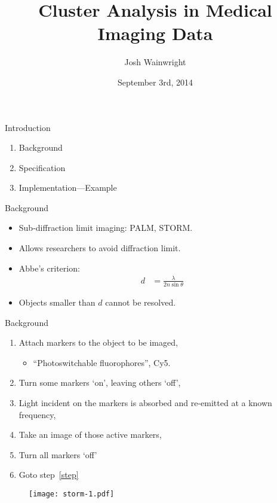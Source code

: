 \documentclass{beamer}
\title{Cluster Analysis in Medical Imaging Data}
\author{Josh Wainwright}
\institute{Supervisor: Iain Styles}
\date{September 3rd, 2014}
\begin{document}
\graphicspath{ {images/} }

\begin{frame}
\titlepage%
\end{frame}

\begin{frame}{Introduction}
	\begin{enumerate}
		\item Background
		\item Specification
		\item Implementation---Example
	\end{enumerate}
\end{frame}

\begin{frame}{Background}
	\begin{itemize}
		\item Sub-diffraction limit imaging: PALM, STORM\@.
		\item Allows researchers to avoid diffraction limit.
		\item Abbe's criterion:
			\begin{align}
				d &= \frac{\lambda}{2n\sin\theta}
			\end{align}
		\item Objects smaller than $d$ cannot be resolved.
	\end{itemize}
\end{frame}

\begin{frame}{Background}
	\begin{enumerate}
		\item Attach markers to the object to be imaged,
			\begin{itemize}
				\item ``Photoswitchable fluorophores'', Cy5.
			\end{itemize}
		\item\label{step} Turn some markers `on', leaving others `off',
		\item Light incident on the markers is absorbed and re-emitted at a
			known frequency,
		\item Take an image of those active markers,
		\item Turn all markers `off'
		\item Goto step~\ref{step}
	\end{enumerate}
\end{frame}

\begin{frame}
	\begin{figure}
		\texttt{[image: storm-1.pdf]}
	\end{figure}
\end{frame}
\end{document}

